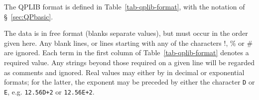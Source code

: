 
The QPLIB format is defined in Table~\ref{tab-qplib-format}, with the notation of \S~\ref{sec:QPbasic}.

The data is in free format (blanks separate values), but must occur in
the order given here. Any blank lines, or lines starting with any of the
characters !, \% or \# are ignored. Each term in the first column of
Table~\ref{tab-qplib-format} denotes a required value. Any strings beyond
those required on a given line will be regarded as comments and ignored.
Real values may either by in decimal or exponential formats; for the latter,
the exponent may be preceded by either the character \texttt{D} or \texttt{E},
e.g. \texttt{12.56D+2} or \texttt{12.56E+2}.

